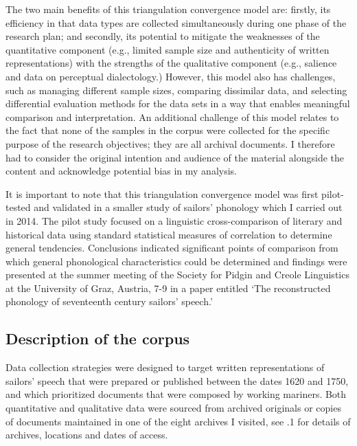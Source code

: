 The two main benefits of this triangulation convergence model are: firstly, its efficiency in that data types are collected simultaneously during one phase of the research plan; and secondly, its potential to mitigate the weaknesses of the quantitative component (e.g., limited sample size and authenticity of written representations) with the strengths of the qualitative component (e.g., salience and data on perceptual dialectology.) However, this model also has challenges, such as managing different sample sizes, comparing dissimilar data, and selecting differential evaluation methods for the data sets in a way that enables meaningful comparison and interpretation. An additional challenge of this model relates to the fact that none of the samples in the corpus were collected for the specific purpose of the research objectives; they are all archival documents. I therefore had to consider the original intention and audience of the material alongside the content and acknowledge potential bias in my analysis. 



It is important to note that this triangulation convergence model was first pilot-tested and validated in a smaller study of sailors’ phonology which I carried out in 2014. The pilot study focused on a linguistic cross-comparison of literary and historical data using standard statistical measures of correlation to determine general tendencies. Conclusions indicated significant points of comparison from which general phonological characteristics could be determined and findings were presented at the summer meeting of the Society for Pidgin and Creole Linguistics at the University of Graz, Austria, 7-9 \citealt{July2015} in a paper entitled ‘The reconstructed phonology of seventeenth century sailors’ speech.’



\subsection{{Description} {of} {the} {corpus}}%



Data collection strategies were designed to target written representations of sailors’ speech that were prepared or published between the dates 1620 and 1750, and which prioritized documents that were composed by working mariners. Both quantitative and qualitative data were sourced from archived originals or copies of documents maintained in one of the eight archives I visited, see .1 for details of archives, locations and dates of access.


